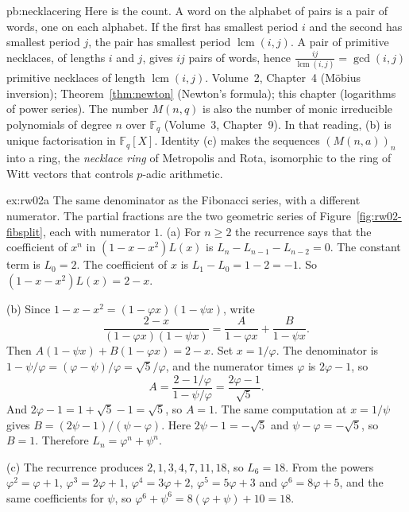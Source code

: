 \begin{solution}{pb:necklacering}
Here is the count. A word on the alphabet of pairs is a pair of words, one on each alphabet. If the first has smallest period $i$
and the second has smallest period $j$, the pair has smallest period $\operatorname{lcm}(i,j)$. A pair of primitive necklaces, of lengths $i$ and $j$,
gives $ij$ pairs of words, hence $\frac{ij}{\operatorname{lcm}(i,j)}=\gcd(i,j)$ primitive necklaces of length $\operatorname{lcm}(i,j)$.
\tools Volume~2, Chapter~4 (Möbius inversion); Theorem~\ref{thm:newton} (Newton's formula); this chapter (logarithms of power series).
\leads The number $M(n,q)$ is also the number of monic irreducible polynomials of degree $n$ over $\mathbb F_q$ (Volume~3, Chapter~9). In that reading,
(b) is unique factorisation in $\mathbb F_q[X]$. Identity (c) makes the sequences $(M(n,a))_n$ into a ring, the \emph{necklace
ring} of Metropolis and Rota, isomorphic to the ring of Witt vectors that controls $p$-adic arithmetic.
\end{solution}


\begin{solution}{ex:rw02a}
\idea The same denominator as the Fibonacci series, with a different numerator. The partial fractions are the two geometric series of Figure~\ref{fig:rw02-fibsplit}, each with numerator $1$.
\writeup (a) For $n\ge2$ the recurrence says that the coefficient of $x^n$ in $(1-x-x^2)L(x)$ is $L_n-L_{n-1}-L_{n-2}=0$. The constant term is $L_0=2$. The coefficient of $x$ is $L_1-L_0=1-2=-1$. So $(1-x-x^2)L(x)=2-x$.

(b) Since $1-x-x^2=(1-\varphi x)(1-\psi x)$, write
\[
\frac{2-x}{(1-\varphi x)(1-\psi x)}=\frac{A}{1-\varphi x}+\frac{B}{1-\psi x}.
\]
Then $A(1-\psi x)+B(1-\varphi x)=2-x$. Set $x=1/\varphi$. The denominator is $1-\psi/\varphi=(\varphi-\psi)/\varphi=\sqrt5/\varphi$, and the numerator times $\varphi$ is $2\varphi-1$, so
\[
A=\frac{2-1/\varphi}{1-\psi/\varphi}=\frac{2\varphi-1}{\sqrt5}.
\]
And $2\varphi-1=1+\sqrt5-1=\sqrt5$, so $A=1$. The same computation at $x=1/\psi$ gives $B=(2\psi-1)/(\psi-\varphi)$. Here $2\psi-1=-\sqrt5$ and $\psi-\varphi=-\sqrt5$, so $B=1$. Therefore $L_n=\varphi^n+\psi^n$.

(c) The recurrence produces $2,1,3,4,7,11,18$, so $L_6=18$. From the powers $\varphi^2=\varphi+1$, $\varphi^3=2\varphi+1$, $\varphi^4=3\varphi+2$, $\varphi^5=5\varphi+3$ and $\varphi^6=8\varphi+5$, and the same coefficients for $\psi$, so $\varphi^6+\psi^6=8(\varphi+\psi)+10=18$.
\end{solution}

